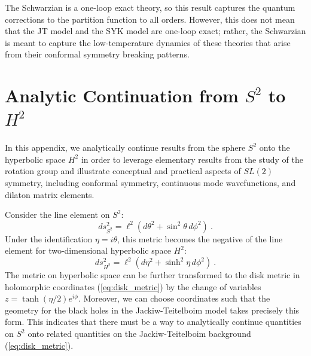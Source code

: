 \documentclass[12pt]{article}
\begin{document}
The Schwarzian is a one-loop exact theory, so this result captures the quantum corrections to the partition function to all orders.  However, this does not mean that the JT model and the SYK model are one-loop exact; rather, the Schwarzian is meant to capture the low-temperature dynamics of these theories that arise from their conformal symmetry breaking patterns.

\section{Analytic Continuation from \texorpdfstring{$S^2$}{S2} to \texorpdfstring{$H^2$}{H2}}
\label{app:cont}

In this appendix, we analytically continue results from the sphere $S^2$ onto the hyperbolic space $H^2$ in order to leverage elementary results from the study of the rotation group and illustrate conceptual and practical aspects of $SL(2)$ symmetry, including conformal symmetry, continuous mode wavefunctions, and dilaton matrix elements.

Consider the line element on $S^2$:
\begin{equation}
	ds^2_{S^2} = \ell^2\left(d\theta^2 + \sin^2\theta\,d\phi^2\right)~.
\end{equation}
Under the identification $\eta = i \theta$, this metric becomes the negative of the line element for two-dimensional hyperbolic space $H^2$:
\begin{equation}
	ds^2_{H^2} = \ell^2\left(d\eta^2 + \sinh^2\eta\,d\phi^2\right)~.
\end{equation}
The metric on hyperbolic space can be further transformed to the disk metric in holomorphic coordinates (\ref{eq:disk_metric}) by the change of variables $z = \tanh\left(\eta/2\right) e^{i\phi}$.  Moreover, we can choose coordinates such that the geometry for the black holes in the Jackiw-Teitelboim model takes precisely this form. This indicates that there must be a way to analytically continue quantities on $S^2$ onto related quantities on the Jackiw-Teitelboim background (\ref{eq:disk_metric}).
\end{document}
